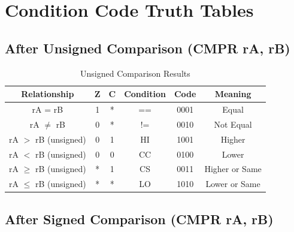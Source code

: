 \section{Condition Code Truth Tables}

\subsection{After Unsigned Comparison (CMPR rA, rB)}

\begin{table}[H]
	\centering
	\begin{tabular}{cccccc}
		\toprule
		\textbf{Relationship}   & \textbf{Z} & \textbf{C} & \textbf{Condition} & \textbf{Code} & \textbf{Meaning} \\
		\midrule
		rA = rB                 & 1          & *          & ==                 & 0001          & Equal            \\
		rA $\neq$ rB            & 0          & *          & !=                 & 0010          & Not Equal        \\
		rA $>$ rB (unsigned)    & 0          & 1          & HI                 & 1001          & Higher           \\
		rA $<$ rB (unsigned)    & 0          & 0          & CC                 & 0100          & Lower            \\
		rA $\geq$ rB (unsigned) & *          & 1          & CS                 & 0011          & Higher or Same   \\
		rA $\leq$ rB (unsigned) & *          & *          & LO                 & 1010          & Lower or Same    \\
		\bottomrule
	\end{tabular}
	\caption{Unsigned Comparison Results}
\end{table}

\subsection{After Signed Comparison (CMPR rA, rB)}

